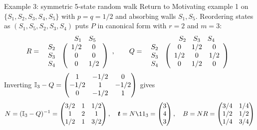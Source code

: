 \documentclass[aspectratio=169]{beamer}\usepackage[]{graphicx}\usepackage[]{xcolor}
\providecommand{\bt}{\bm{t}}
\begin{document}
\begin{frame}{Example 3: symmetric 5-state random walk}
Return to Motivating example 1 on $\{S_1, S_2, S_3, S_4, S_5\}$ with $p = q = 1/2$ and absorbing walls $S_1, S_5$. Reordering states as $(S_1, S_5, S_2, S_3, S_4)$ puts $P$ in canonical form with $r=2$ and $m=3$:
\[
R = \begin{array}{c@{\hspace{4pt}}c}
& \begin{array}{cc} S_1 & S_5 \end{array} \\
\begin{array}{c} S_2 \\ S_3 \\ S_4 \end{array} &
\left(\begin{array}{cc}
1/2 & 0 \\
0 & 0 \\
0 & 1/2
\end{array}\right)
\end{array}, \qquad
Q = \begin{array}{c@{\hspace{4pt}}c}
& \begin{array}{ccc} S_2 & S_3 & S_4 \end{array} \\
\begin{array}{c} S_2 \\ S_3 \\ S_4 \end{array} &
\left(\begin{array}{ccc}
0 & 1/2 & 0 \\
1/2 & 0 & 1/2 \\
0 & 1/2 & 0
\end{array}\right)
\end{array}
\]
\vfill
Inverting $\mathbb{I}_3 - Q = \begin{pmatrix} 1 & -1/2 & 0 \\ -1/2 & 1 & -1/2 \\ 0 & -1/2 & 1 \end{pmatrix}$ gives
\[
N = (\II_3 - Q)^{-1} = \begin{pmatrix}
3/2 & 1 & 1/2 \\
1 & 2 & 1 \\
1/2 & 1 & 3/2
\end{pmatrix}, \quad
\bt = N\11_3 = \begin{pmatrix} 3 \\ 4 \\ 3 \end{pmatrix}, \quad
B = N R = \begin{pmatrix}
3/4 & 1/4 \\
1/2 & 1/2 \\
1/4 & 3/4
\end{pmatrix}
\]
\end{frame}
\end{document}
